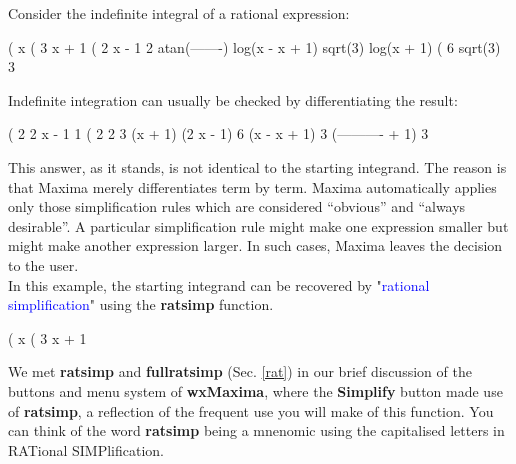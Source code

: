 \documentclass[11pt]{article}
\newcommand{\tcb}{\textcolor{blue}}
\begin{document}
\noindent Consider the indefinite integral of a rational expression:
\begin{myVerbatim}
(%
                                      x
(%
                                     3
                                    x  + 1
(%
                                        2 x - 1
                      2            atan(-------)
                 log(x  - x + 1)        sqrt(3)    log(x + 1)
(%
                        6             sqrt(3)          3
\end{myVerbatim}  
Indefinite integration can usually be checked by differentiating the
  result:
\begin{myVerbatim}
(%
                        2               2 x - 1           1
(%
                            2            2            3 (x + 1)
                   (2 x - 1)         6 (x  - x + 1)
                3 (---------- + 1)
                       3
\end{myVerbatim}
This answer, as it stands, is not identical to the starting integrand.
The reason is that Maxima merely differentiates term by term.
Maxima automatically applies only those simplification rules which are
  considered ``obvious'' and ``always desirable''.
A particular simplification rule might make one expression smaller
  but might make another expression larger.
In such cases, Maxima leaves the decision to the user.\\

\noindent In this example, the starting integrand can be recovered by
  "\tcb{rational simplification}" using the \textbf{ratsimp} function.
\begin{myVerbatim}
(%
                                      x
(%
                                     3
                                    x  + 1
\end{myVerbatim}
We met \textbf{ratsimp} and \textbf{fullratsimp} (Sec. \ref{rat}) in our brief 
  discussion of the buttons and menu system of \textbf{wxMaxima}, where the
  \textbf{Simplify} button made use of \textbf{ratsimp}, a reflection of 
  the frequent use you will make of this function.
You can think of the word \textbf{ratsimp} being a mnenomic using the
  capitalised letters in RATional SIMPlification.\\
  
\end{document}
